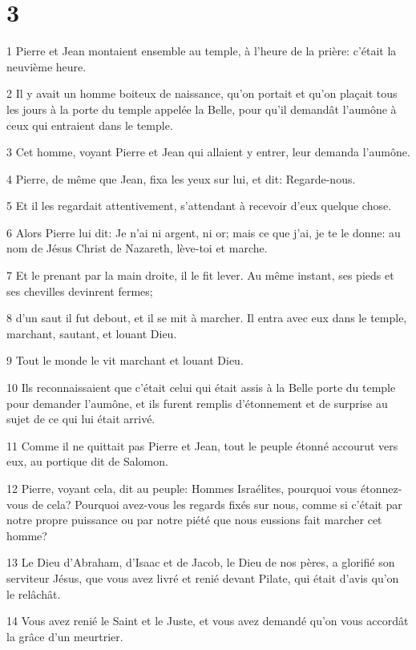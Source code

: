 \chapter{3}

\par 1 Pierre et Jean montaient ensemble au temple, à l'heure de la prière: c'était la neuvième heure.
\par 2 Il y avait un homme boiteux de naissance, qu'on portait et qu'on plaçait tous les jours à la porte du temple appelée la Belle, pour qu'il demandât l'aumône à ceux qui entraient dans le temple.
\par 3 Cet homme, voyant Pierre et Jean qui allaient y entrer, leur demanda l'aumône.
\par 4 Pierre, de même que Jean, fixa les yeux sur lui, et dit: Regarde-nous.
\par 5 Et il les regardait attentivement, s'attendant à recevoir d'eux quelque chose.
\par 6 Alors Pierre lui dit: Je n'ai ni argent, ni or; mais ce que j'ai, je te le donne: au nom de Jésus Christ de Nazareth, lève-toi et marche.
\par 7 Et le prenant par la main droite, il le fit lever. Au même instant, ses pieds et ses chevilles devinrent fermes;
\par 8 d'un saut il fut debout, et il se mit à marcher. Il entra avec eux dans le temple, marchant, sautant, et louant Dieu.
\par 9 Tout le monde le vit marchant et louant Dieu.
\par 10 Ils reconnaissaient que c'était celui qui était assis à la Belle porte du temple pour demander l'aumône, et ils furent remplis d'étonnement et de surprise au sujet de ce qui lui était arrivé.
\par 11 Comme il ne quittait pas Pierre et Jean, tout le peuple étonné accourut vers eux, au portique dit de Salomon.
\par 12 Pierre, voyant cela, dit au peuple: Hommes Israélites, pourquoi vous étonnez-vous de cela? Pourquoi avez-vous les regards fixés sur nous, comme si c'était par notre propre puissance ou par notre piété que nous eussions fait marcher cet homme?
\par 13 Le Dieu d'Abraham, d'Isaac et de Jacob, le Dieu de nos pères, a glorifié son serviteur Jésus, que vous avez livré et renié devant Pilate, qui était d'avis qu'on le relâchât.
\par 14 Vous avez renié le Saint et le Juste, et vous avez demandé qu'on vous accordât la grâce d'un meurtrier.
